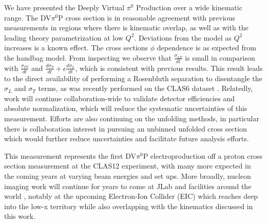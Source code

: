     We have presented the Deeply Virtual $\pi^0$ Production over a wide kinematic range. The DV$\pi^0$P cross section is in reasonable agreement with previous measurements in regions where there is kinematic overlap, as well as with the leading theory parametrization at low $Q^2$. Deviations from the model as $Q^2$ increases is a known effect. The cross sections $\phi$ dependence is as expected from the handbag model. From inspecting  we observe that $\frac{\sigma_{LT}}{dt}$ is small in comparison with $\frac{\sigma_{TT}}{dt}$ and  $\frac{d\sigma_T}{dt} + \epsilon \frac{d\sigma_L}{dt}$, which is consistent with previous results. %
    This result leads to the direct availability of performing a Rosenbluth separation to disentangle the $\sigma_L$ and $\sigma_T$ terms, as was recently  performed on the CLAS6 dataset \parencite{Korover2021RosenbluthProton}. Relatedly, work will continue collaboration-wide to validate detector efficiencies and absolute normalization, which will reduce the systematic uncertainties of this measurement. Efforts are also continuing on the unfolding methods, in particular there is collaboration interest in pursuing an unbinned unfolded cross section \parencite{Andreassen2020OmniFold:Observables} which would further reduce uncertainties and facilitate future analysis efforts. 
        

     
    This measurement represents the first DV$\pi^0$P electroproduction off a proton cross section measurement at the CLAS12 experiment, with many more expected in the coming years at varying beam energies and set ups. More broadly, nucleon imaging work will continue for years to come at JLab and facilities around the world , notably at the upcoming Electron-Ion Collider (EIC) which reaches deep into the low-x territory while also overlapping with the kinematics discussed in this work. 

